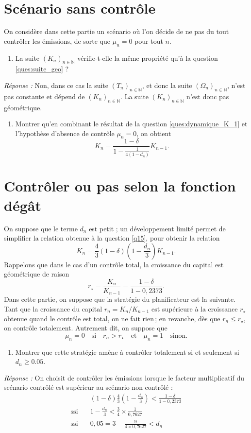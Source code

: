 \documentclass[12pt,a4paper]{article}
\newcommand{\ques}[1]{\begin{enumerate}[resume]
\item  #1
\end{enumerate}}
\newcommand{\rep}[1]{\textit{Réponse :} #1 \\}
\theoremstyle{remark}
\def\NN{\mathbb{N}}
\begin{document}
{\section*{\sc Scénario sans contrôle}
On considère dans cette partie un scénario où l'on décide de ne pas du tout contrôler les émissions, de sorte que $\mu_n=0$ pour tout $n$.
\ques{La suite $(K_n)_{n\in \NN}$ vérifie-t-elle la même propriété qu'à la question \ref{ques:suite_geo} ?}
\rep{Non, dans ce cas la suite $(T_n)_{n\in \NN}$, et donc la suite $(\Omega_n)_{n\in \NN}$, n'est pas constante et dépend de $(K_n)_{n\in \NN}$. La suite $(K_n)_{n\in \NN}$ n'est donc pas géométrique.}


\ques{\label{q15}Montrer qu'en combinant le résultat de la question \ref{ques:dynamique_K_1} et l'hypothèse d'absence de contrôle $\mu_n =0$, on obtient
\begin{equation*} 
K_n=\frac{1- \delta}{1- \frac{1}{4(1-d_n)}} K_{n-1}.\end{equation*}
\label{ques:dynamique_K_3}
}

\section*{\sc Contrôler ou pas selon la fonction dégât}

On suppose que le terme $d_n$ est petit ; un développement limité permet de simplifier la relation obtenue à la question \ref{q15}, pour obtenir la relation
\begin{equation*} 
K_n=\frac{4}{3}(1- \delta)\left(1-\frac{d_n}{3}\right) K_{n-1}.
\end{equation*}
Rappelons que dans le cas d'un contrôle total, la croissance du capital est géométrique de raison 
$$
r_\star = \frac{K_n}{K_{n-1}} = \frac{1- \delta}{1- 0,2373}.
$$
Dans cette partie, on suppose que la stratégie du planificateur est la suivante. Tant que la croissance du capital $r_n = K_n / K_{n-1}$ est supérieure à la croissance $r_\star$ obtenue quand le contrôle est total, on ne fait rien$\,$; en revanche, dès que $r_n \leqslant r_\star$, on contrôle totalement. Autrement dit, on suppose que
$$
 \mu_n = 0 \quad \text{si} \quad r_n > r_\star \quad \text{et} \quad \mu_n = 1 \quad \text{sinon.}
$$

\ques{Montrer que cette stratégie amène à contrôler totalement si et seulement si $d_n \geqslant 0.05.$}
\rep{On choisit de contrôler les émissions lorsque le facteur multiplicatif du scénario contrôlé est supérieur au scénario non contrôlé :
\begin{equation*}
\begin{aligned}
&(1-\delta)\frac{4}{3}\left(1-\frac{d_n}{3}\right) < \frac{1-\delta}{1-0,2373} \\
\text{ssi} \quad &1-\frac{d_n}{3} < \frac{3}{4}\times \frac{1}{0,7627} \\
\text{ssi} \quad &0,05 = 3-\frac{9}{4 \times 0,7627} < d_n
\end{aligned}
\end{equation*}
}

}
\end{document}
